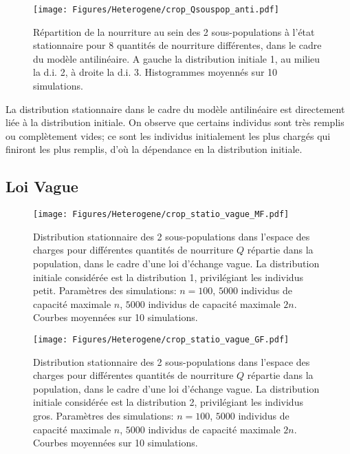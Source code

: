 \begin{figure}[h!]
\centering
\texttt{[image: Figures/Heterogene/crop\_Qsouspop\_anti.pdf]}
\caption{Répartition de la nourriture au sein des 2 sous-populations à l'état stationnaire pour 8 quantités de nourriture différentes, dans le cadre du modèle antilinéaire. A gauche la distribution initiale 1, au milieu la d.i. 2, à droite la d.i. 3. Histogrammes moyennés sur 10 simulations.}
\label{Qsouspop_anti}
\end{figure}

La distribution stationnaire dans le cadre du modèle antilinéaire est directement liée à la distribution initiale. On observe que certains individus sont très remplis ou complètement vides; ce sont les individus initialement les plus chargés qui finiront les plus remplis, d'où la dépendance en la distribution initiale.


\clearpage

\subsection{Loi Vague}

\begin{figure}[h!]
\centering
\texttt{[image: Figures/Heterogene/crop\_statio\_vague\_MF.pdf]}
\caption{Distribution stationnaire des 2 sous-populations dans l'espace des charges pour différentes quantités de nourriture $Q$ répartie dans la population, dans le cadre d'une loi d'échange vague. La distribution initiale considérée est la distribution 1, privilégiant les individus petit. Paramètres des simulations: $n=100$, $5000$ individus de capacité maximale $n$, $5000$ individus de capacité maximale $2n$. Courbes moyennées sur 10 simulations.}
\label{statio_vague_MF}
\end{figure}

\begin{figure}[h!]
\centering
\texttt{[image: Figures/Heterogene/crop\_statio\_vague\_GF.pdf]}
\caption{Distribution stationnaire des 2 sous-populations dans l'espace des charges pour différentes quantités de nourriture $Q$ répartie dans la population, dans le cadre d'une loi d'échange vague. La distribution initiale considérée est la distribution 2, privilégiant les individus gros. Paramètres des simulations: $n=100$, $5000$ individus de capacité maximale $n$, $5000$ individus de capacité maximale $2n$. Courbes moyennées sur 10 simulations.}
\label{statio_vague_GF}
\end{figure}

